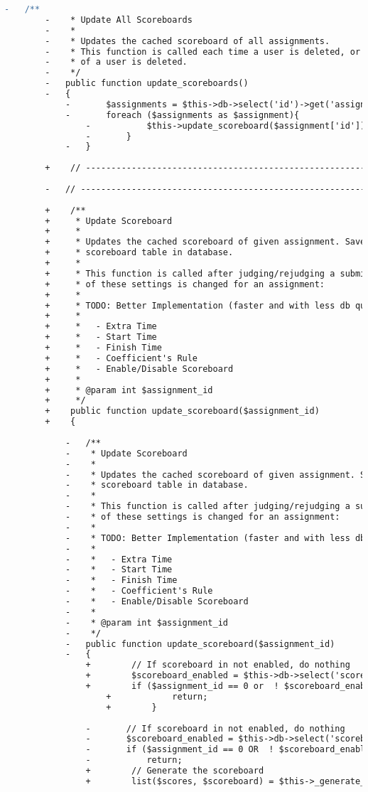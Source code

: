 \begin{lstlisting}[language=diff, caption=Perubahan pada kode Scoreboard\_model.php]
		-	/**
		-	 * Update All Scoreboards
		-	 *
		-	 * Updates the cached scoreboard of all assignments.
		-	 * This function is called each time a user is deleted, or all submissions
		-	 * of a user is deleted.
		-	 */
		-	public function update_scoreboards()
		-	{
			-		$assignments = $this->db->select('id')->get('assignments')->result_array();
			-		foreach ($assignments as $assignment){
				-			$this->update_scoreboard($assignment['id']);
				-		}
			-	}
		
		+    // ------------------------------------------------------------------------
		
		-	// ------------------------------------------------------------------------
		
		+    /**
		+     * Update Scoreboard
		+     *
		+     * Updates the cached scoreboard of given assignment. Saves the html code of
		+     * scoreboard table in database.
		+     *
		+     * This function is called after judging/rejudging a submission, and when one
		+     * of these settings is changed for an assignment:
		+     *
		+     * TODO: Better Implementation (faster and with less db queries)
		+     *
		+     *   - Extra Time
		+     *   - Start Time
		+     *   - Finish Time
		+     *   - Coefficient's Rule
		+     *   - Enable/Disable Scoreboard
		+     *
		+     * @param int $assignment_id
		+     */
		+    public function update_scoreboard($assignment_id)
		+    {
			
			-	/**
			-	 * Update Scoreboard
			-	 *
			-	 * Updates the cached scoreboard of given assignment. Saves the html code of
			-	 * scoreboard table in database.
			-	 *
			-	 * This function is called after judging/rejudging a submission, and when one
			-	 * of these settings is changed for an assignment:
			-	 *
			-	 * TODO: Better Implementation (faster and with less db queries)
			-	 *
			-	 *   - Extra Time
			-	 *   - Start Time
			-	 *   - Finish Time
			-	 *   - Coefficient's Rule
			-	 *   - Enable/Disable Scoreboard
			-	 *
			-	 * @param int $assignment_id
			-	 */
			-	public function update_scoreboard($assignment_id)
			-	{
				+        // If scoreboard in not enabled, do nothing
				+        $scoreboard_enabled = $this->db->select('scoreboard')->get_where('assignments', array('id' => $assignment_id))->row()->scoreboard;
				+        if ($assignment_id == 0 or  ! $scoreboard_enabled) {
					+            return;
					+        }
				
				-		// If scoreboard in not enabled, do nothing
				-		$scoreboard_enabled = $this->db->select('scoreboard')->get_where('assignments', array('id'=>$assignment_id))->row()->scoreboard;
				-		if ($assignment_id == 0 OR  ! $scoreboard_enabled )
				-			return;
				+        // Generate the scoreboard
				+        list($scores, $scoreboard) = $this->_generate_scoreboard($assignment_id);
				

\end{lstlisting}
